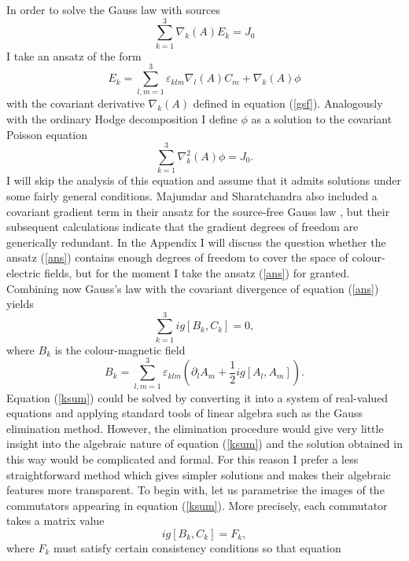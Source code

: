 \documentclass[a4paper,12pt]{article}
\begin{document}
In order to solve the Gauss law with sources
\begin{equation}\label{gauss}
\sum_{k=1}^3 \nabla_k(A) E_k = J_0
\end{equation}
I take an ansatz of the form
\begin{equation}\label{ans}
E_k = \sum_{l,m=1}^3 \varepsilon_{klm} \nabla_l(A) C_m + \nabla_k(A) \phi
\end{equation}
with the covariant derivative $\nabla_k(A)$ defined in equation (\ref{gsf}). Analogously with the ordinary Hodge decomposition I define $\phi$ as a solution to the covariant Poisson equation
\begin{equation} \label{pois}
\sum_{k=1}^3 \nabla_k^2(A) \phi = J_0. 
\end{equation}
I will skip the analysis of this equation and assume that it admits solutions under some fairly general conditions. Majumdar and Sharatchandra also included a covariant gradient term in their ansatz for the source-free Gauss law \cite{ms1}, but their subsequent calculations \cite{ms2} indicate that the gradient degrees of freedom are generically redundant. In the Appendix I will discuss the question whether the ansatz (\ref{ans}) contains enough degrees of freedom to cover the space of colour-electric fields, but for the moment I take the ansatz (\ref{ans}) for granted. Combining now Gauss's law with the covariant divergence of equation (\ref{ans}) yields
\begin{equation}
\sum_{k=1}^3 ig [B_k,C_k] = 0, \label{ksum}
\end{equation}
where $B_k$ is the colour-magnetic field
$$ B_k = \sum_{l,m=1}^3 \varepsilon_{klm} \left( \partial_l A_m + \frac{1}{2} ig
[A_l,A_m] \right). $$
Equation (\ref{ksum}) could be solved by converting it into a system of real-valued equations and applying standard tools of linear algebra such as the Gauss elimination method. However, the  elimination procedure would give very little insight into the algebraic nature of equation (\ref{ksum}) and the solution obtained in this way would be complicated and formal. For this reason I prefer a less straightforward method which gives simpler solutions and makes their algebraic features more transparent. To begin with, let us parametrise the images of the commutators appearing in equation (\ref{ksum}). More precisely, each commutator takes a matrix value
\begin{equation}\label{keq}
ig [B_k,C_k] = F_k,
\end{equation}
where $F_k$ must satisfy certain consistency conditions so that equation
\end{document}
